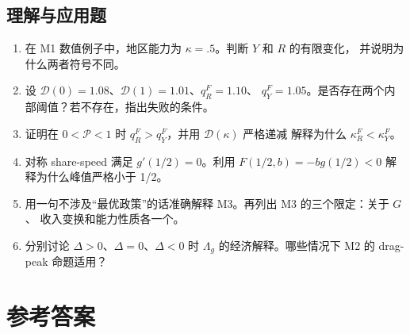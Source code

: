 \documentclass[UTF8,11pt,scheme=chinese,fontset=windows]{ctexart}
\newcommand{\calD}{\mathcal D}
\newcommand{\calP}{\mathcal P}
\theoremstyle{definition}
\begin{document}
\subsection{理解与应用题}
\begin{enumerate}[resume]
  \item 在 M1 数值例子中，地区能力为 \(\kappa=.5\)。判断 \(Y\) 和 \(R\) 的有限变化，
  并说明为什么两者符号不同。

  \item 设 \(\calD(0)=1.08\)、\(\calD(1)=1.01\)、\(q_R^F=1.10\)、
  \(q_Y^F=1.05\)。是否存在两个内部阈值？若不存在，指出失败的条件。

  \item 证明在 \(0<\calP<1\) 时 \(q_R^F>q_Y^F\)，并用 \(\calD(\kappa)\) 严格递减
  解释为什么 \(\kappa_R^F<\kappa_Y^F\)。

  \item 对称 share-speed 满足 \(g'(1/2)=0\)。利用
  \(F(1/2,b)=-bg(1/2)<0\) 解释为什么峰值严格小于 1/2。

  \item 用一句不涉及“最优政策”的话准确解释 M3。再列出 M3 的三个限定：关于 \(G\)、
  收入变换和能力性质各一个。

  \item 分别讨论 \(\Delta>0\)、\(\Delta=0\)、\(\Delta<0\) 时
  \(\Lambda_g\) 的经济解释。哪些情况下 M2 的 drag-peak 命题适用？
\end{enumerate}

\clearpage
\section{参考答案}
\end{document}
